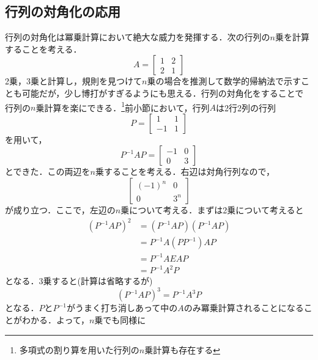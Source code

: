 \documentclass[a4paper,12pt,autodetect-engine,dvipdfmx]{jsarticle}
\theoremstyle{definition}
\begin{document}
\subsection{行列の対角化の応用}
行列の対角化は冪乗計算において絶大な威力を発揮する．次の行列の$n$乗を計算することを考える．
\begin{equation*}
    A=
    \begin{bmatrix}
        1 & 2\\
        2 & 1
    \end{bmatrix}
\end{equation*}
2乗，3乗と計算し，規則を見つけて$n$乗の場合を推測して数学的帰納法で示すことも可能だが，少し博打がすぎるようにも思える．行列の対角化をすることで
行列の$n$乗計算を楽にできる．\footnote{多項式の割り算を用いた行列の$n$乗計算も存在する}前小節において，行列$A$は2行2列の行列
\begin{equation*}
    P=
    \begin{bmatrix}
        1 & 1\\
        -1 & 1
    \end{bmatrix}
\end{equation*}
を用いて，
\begin{equation}
    P^{-1}AP=
    \begin{bmatrix}
        -1 & 0\\
        0 & 3
    \end{bmatrix}
\end{equation}
とできた．この両辺を$n$乗することを考える．右辺は対角行列なので，
\begin{equation*}
    \begin{bmatrix}
        (-1)^n & 0\\
        0 & 3^n
    \end{bmatrix}
\end{equation*}
が成り立つ．ここで，左辺の$n$乗について考える．まずは2乗について考えると
\begin{align*}
    (P^{-1}AP)^2 &= (P^{-1}AP)(P^{-1}AP)\\
                 &= P^{-1}A(PP^{-1})AP\\
                 &= P^{-1}AEAP\\
                 &= P^{-1}A^2P 
\end{align*}
となる．3乗すると(計算は省略するが)
\begin{equation*}
    (P^{-1}AP)^3 = P^{-1}A^3P
\end{equation*}
となる．$P$と$P^{-1}$がうまく打ち消しあって中の$A$のみ冪乗計算されることになることがわかる．よって，$n$乗でも同様に
\end{document}

